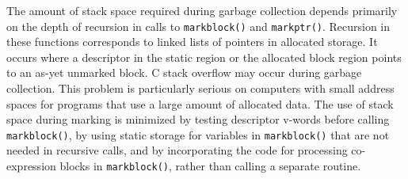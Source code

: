 
The amount of stack space required during garbage collection depends
primarily on the depth of recursion in calls to \texttt{markblock()}
and \texttt{markptr()}. Recursion in these functions corresponds to
linked lists of pointers in allocated storage. It occurs where a
descriptor in the static region or the allocated block region points
to an as-yet unmarked block. C stack overflow may occur during garbage
collection. This problem is particularly serious on computers with
small address spaces for programs that use a large amount of allocated
data. The use of stack space during marking is minimized by testing
descriptor v-words before calling \texttt{markblock()}, by using
static storage for variables in \texttt{markblock()} that are not
needed in recursive calls, and by incorporating the code for
processing co-expression blocks in \texttt{markblock()}, rather than
calling a separate routine.

